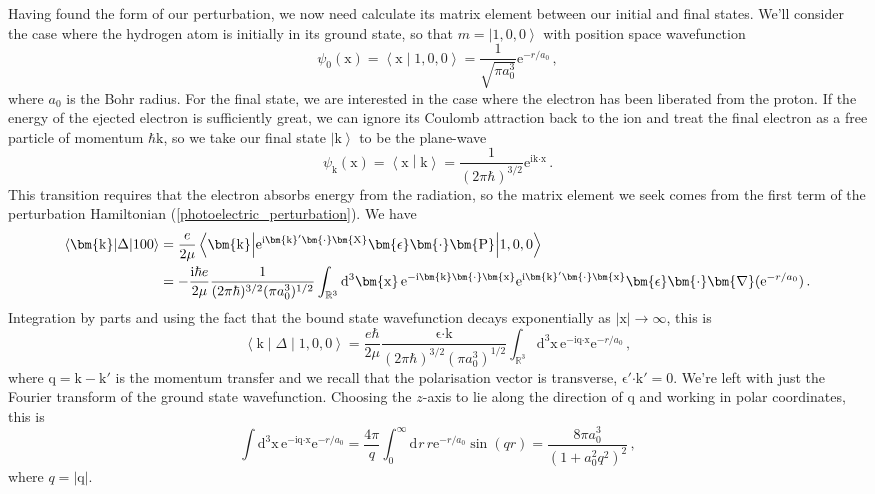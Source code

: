 \documentclass{article}
\theoremstyle{plain}\theoremheaderfont{\normalfont\itshape}\theorembodyfont{\rmfamily}\theoremseparator{.}\newtheorem*{rem}{Remark}\newtheorem*{ex}{Example}\newtheorem*{proof}{Proof}\newtheorem*{altp}{Alternative proof}
\theoremstyle{plain}\theoremheaderfont{\normalfont\bfseries}\theorembodyfont{\rmfamily}\theoremseparator{.}\newtheorem{thm}{Theorem}[section]\newtheorem{lem}[thm]{Lemma}\newtheorem{prop}[thm]{Proposition}\newtheorem*{cor}{Corollary}\newtheorem{defn}[thm]{Definition}\newtheorem{clm}[thm]{Claim}\newtheorem{clminproof}{Claim}
\theoremstyle{break}\theoremheaderfont{\normalfont\itshape}\theorembodyfont{\rmfamily}\theoremseparator{.\medskip}\newtheorem*{proofskip}{Proof}\newtheorem*{exs}{Examples}\newtheorem*{rems}{Remarks}
\theoremstyle{break}\theoremheaderfont{\normalfont\bfseries}\theorembodyfont{\rmfamily}\theoremseparator{.\medskip}\newtheorem{lemskip}[thm]{Lemma}\newtheorem{defnskip}[thm]{Definition}\newtheorem{propskip}[thm]{Proposition}\newtheorem{thmskip}[thm]{Theorem}
\numberwithin{equation}{section}
\newcommand{\ii}{\mathrm{i}}
\newcommand{\ee}{\mathrm{e}}
\newcommand{\dd}[2][]{\mathrm{d}^{#1} #2\,}
\newcommand{\ket}[1]{\left| #1 \right\rangle}
\newcommand{\braket}[2]{\left\langle #1 \middle| #2 \right\rangle}
\newcommand{\mel}[3]{\left\langle #1 \middle| #2 \middle| #3 \right\rangle}
\newcommand{\vb}[1]{\bm{\mathrm{#1}}}
\newcommand{\vdot}{\bm{\cdot}}
\newcommand{\abs}[1]{\left| #1 \right|}
\newcommand{\grad}{\vb{\nabla}}
\newcommand{\RR}{\mathbb{R}}
\begin{document}
    Having found the form of our perturbation, we now need calculate its matrix element between our initial and final states. We'll consider the case where the hydrogen atom is initially in its ground state, so that \(m=\ket{1,0,0}\) with position space wavefunction
    \begin{equation}
        \psi_0(\vb{x})=\braket{\vb{x}}{1,0,0}=\frac{1}{\sqrt{\pi a_0^3}}\ee^{-r/a_0}\,,
    \end{equation}
    where \(a_0\) is the Bohr radius. For the final state, we are interested in the case where the electron has been liberated from the proton. If the energy of the ejected electron is sufficiently great, we can ignore its Coulomb attraction back to the ion and treat the final electron as a free particle of momentum \(\hbar\vb{k}\), so we take our final state \(\ket{\vb{k}}\) to be the plane-wave
    \begin{equation}
        \psi_{\vb{k}}(\vb{x})=\braket{\vb{x}}{\vb{k}}=\frac{1}{(2\pi\hbar)^{3/2}}\ee^{\ii \vb{k}\vdot\vb{x}}\,.
    \end{equation}
    This transition requires that the electron absorbs energy from the radiation, so the matrix element we seek comes from the first term of the perturbation Hamiltonian (\ref{photoelectric_perturbation}). We have
    \begin{align}
        \mel{\vb{k}}{\Delta}{100}&=\frac{e}{2\mu}\mel{\vb{k}}{\ee^{\ii \vb{k}'\vdot\vb{X}}\vb{\epsilon}\vdot\vb{P}}{1,0,0}\notag\\
        &=-\frac{\ii\hbar e}{2\mu}\frac{1}{(2\pi\hbar)^{3/2}(\pi a_0^3)^{1/2}}\int_{\RR^3}\dd[3]{\vb{x}}\ee^{-\ii \vb{k}\vdot\vb{x}}\ee^{\ii \vb{k}'\vdot\vb{x}}\vb{\epsilon}\vdot\grad(\ee^{-r/a_0})\,.
    \end{align}
    Integration by parts and using the fact that the bound state wavefunction decays exponentially as \(\abs{\vb{x}}\to\infty\), this is
    \begin{equation}
        \mel{\vb{k}}{\Delta}{1,0,0}=\frac{e\hbar}{2\mu}\frac{\vb{\epsilon}\vdot\vb{k}}{(2\pi\hbar)^{3/2}(\pi a_0^3)^{1/2}}\int_{\RR^3}\dd[3]{\vb{x}}\ee^{-\ii \vb{q}\vdot\vb{x}}\ee^{-r/a_0}\,,
    \end{equation}
    where \(\vb{q}=\vb{k}-\vb{k}'\) is the momentum transfer and we recall that the polarisation vector is transverse, \(\vb{\epsilon}'\vdot\vb{k}'=0\). We're left with just the Fourier transform of the ground state wavefunction. Choosing the \(z\)-axis to lie along the direction of \(\vb{q}\) and working in polar coordinates, this is
    \begin{equation}
        \int\dd[3]{\vb{x}}\ee^{-\ii \vb{q}\vdot\vb{x}}\ee^{-r/a_0}=\frac{4\pi}{q}\int_{0}^{\infty}\dd{r}r \ee^{-r/a_0}\sin(qr)=\frac{8\pi a_0^3}{(1+a_0^2q^2)^2}\,,
    \end{equation}
    where \(q=\abs{\vb{q}}\).
\end{document}
